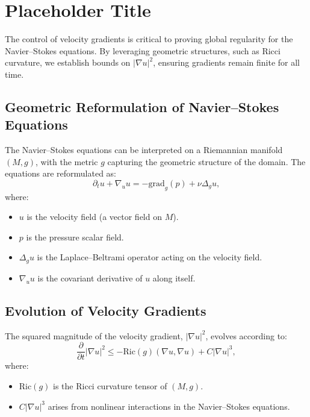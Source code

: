 \section{Placeholder Title}

The control of velocity gradients is critical to proving global regularity for the Navier--Stokes equations. By leveraging geometric structures, such as Ricci curvature, we establish bounds on $|\nabla u|^2$, ensuring gradients remain finite for all time.

\subsection{Geometric Reformulation of Navier--Stokes Equations}
The Navier--Stokes equations can be interpreted on a Riemannian manifold $(M, g)$, with the metric $g$ capturing the geometric structure of the domain. The equations are reformulated as:
\begin{equation}
\partial_t u + \nabla_u u = -\text{grad}_g(p) + \nu \Delta_g u,
\end{equation}
where:
\begin{itemize}
    \item $u$ is the velocity field (a vector field on $M$).
    \item $p$ is the pressure scalar field.
    \item $\Delta_g u$ is the Laplace--Beltrami operator acting on the velocity field.
    \item $\nabla_u u$ is the covariant derivative of $u$ along itself.
\end{itemize}

\subsection{Evolution of Velocity Gradients}
The squared magnitude of the velocity gradient, $|\nabla u|^2$, evolves according to:
\begin{equation}
\frac{\partial}{\partial t} |\nabla u|^2 \leq -\text{Ric}(g)(\nabla u, \nabla u) + C |\nabla u|^3,
\end{equation}
where:
\begin{itemize}
    \item $\text{Ric}(g)$ is the Ricci curvature tensor of $(M, g)$.
    \item $C |\nabla u|^3$ arises from nonlinear interactions in the Navier--Stokes equations.
\end{itemize}

